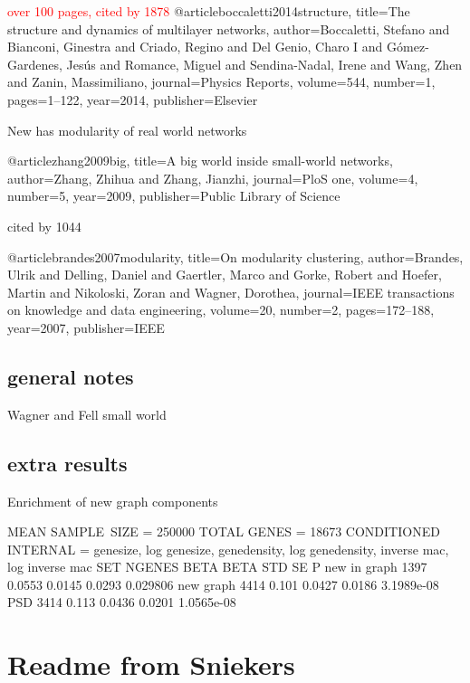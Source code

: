 \textcolor{red}{over 100 pages, cited by 1878}
@article{boccaletti2014structure,
  title={The structure and dynamics of multilayer networks},
  author={Boccaletti, Stefano and Bianconi, Ginestra and Criado, Regino and Del Genio, Charo I and G{\'o}mez-Gardenes, Jes{\'u}s and Romance, Miguel and Sendina-Nadal, Irene and Wang, Zhen and Zanin, Massimiliano},
  journal={Physics Reports},
  volume={544},
  number={1},
  pages={1--122},
  year={2014},
  publisher={Elsevier}
}

New has modularity of real world networks

@article{zhang2009big,
  title={A big world inside small-world networks},
  author={Zhang, Zhihua and Zhang, Jianzhi},
  journal={PloS one},
  volume={4},
  number={5},
  year={2009},
  publisher={Public Library of Science}
}

cited by 1044

@article{brandes2007modularity,
  title={On modularity clustering},
  author={Brandes, Ulrik and Delling, Daniel and Gaertler, Marco and Gorke, Robert and Hoefer, Martin and Nikoloski, Zoran and Wagner, Dorothea},
  journal={IEEE transactions on knowledge and data engineering},
  volume={20},
  number={2},
  pages={172--188},
  year={2007},
  publisher={IEEE}
}

\subsection{general notes}
Wagner and Fell small world

\subsection{extra results}
Enrichment of new graph components


 MEAN SAMPLE\ SIZE = 250000
 TOTAL GENES = 18673
 CONDITIONED INTERNAL = genesize, log genesize, genedensity, log genedensity, inverse mac, log inverse mac
SET           NGENES       BETA   BETA STD         SE            P
new in graph    1397     0.0553     0.0145     0.0293     0.029806
new graph       4414      0.101     0.0427     0.0186   3.1989e-08
PSD             3414      0.113     0.0436     0.0201   1.0565e-08



\section{Readme from Sniekers}
\label{sec:notes readme from sniekers}


